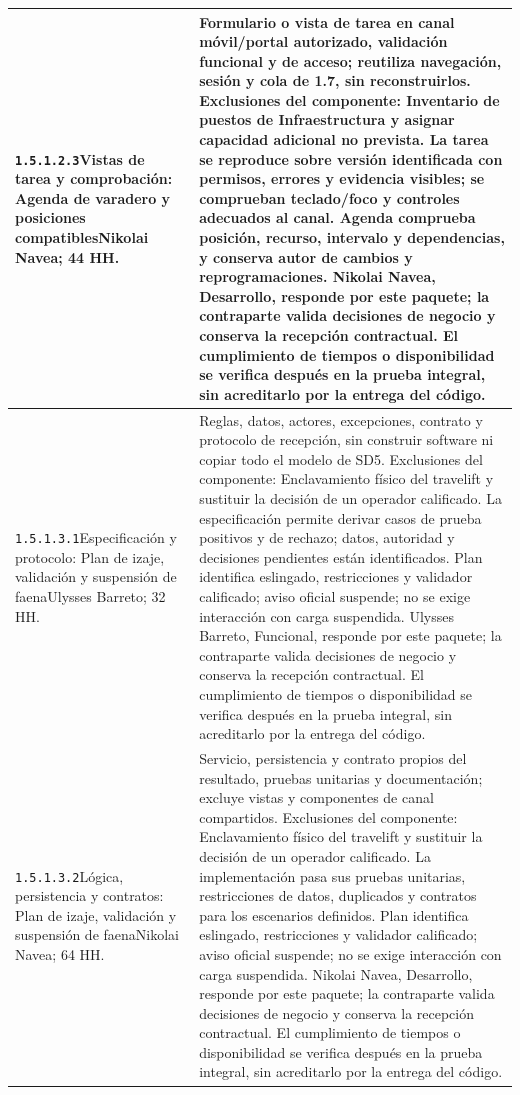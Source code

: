 \begin{longtable}{L{52mm}L{91mm}}
\texttt{1.\allowbreak{}5.\allowbreak{}1.\allowbreak{}2.\allowbreak{}3}\newline Vistas de tarea y comprobación: Agenda de varadero y posiciones compatibles\newline Nikolai Navea; 44 HH. & Formulario o vista de tarea en canal móvil/portal autorizado, validación funcional y de acceso; reutiliza navegación, sesión y cola de 1.7, sin reconstruirlos. Exclusiones del componente: Inventario de puestos de Infraestructura y asignar capacidad adicional no prevista. La tarea se reproduce sobre versión identificada con permisos, errores y evidencia visibles; se comprueban teclado/foco y controles adecuados al canal. Agenda comprueba posición, recurso, intervalo y dependencias, y conserva autor de cambios y reprogramaciones. Nikolai Navea, Desarrollo, responde por este paquete; la contraparte valida decisiones de negocio y conserva la recepción contractual. El cumplimiento de tiempos o disponibilidad se verifica después en la prueba integral, sin acreditarlo por la entrega del código.\\\hline
\texttt{1.\allowbreak{}5.\allowbreak{}1.\allowbreak{}3.\allowbreak{}1}\newline Especificación y protocolo: Plan de izaje, validación y suspensión de faena\newline Ulysses Barreto; 32 HH. & Reglas, datos, actores, excepciones, contrato y protocolo de recepción, sin construir software ni copiar todo el modelo de SD5. Exclusiones del componente: Enclavamiento físico del travelift y sustituir la decisión de un operador calificado. La especificación permite derivar casos de prueba positivos y de rechazo; datos, autoridad y decisiones pendientes están identificados. Plan identifica eslingado, restricciones y validador calificado; aviso oficial suspende; no se exige interacción con carga suspendida. Ulysses Barreto, Funcional, responde por este paquete; la contraparte valida decisiones de negocio y conserva la recepción contractual. El cumplimiento de tiempos o disponibilidad se verifica después en la prueba integral, sin acreditarlo por la entrega del código.\\\hline
\texttt{1.\allowbreak{}5.\allowbreak{}1.\allowbreak{}3.\allowbreak{}2}\newline Lógica, persistencia y contratos: Plan de izaje, validación y suspensión de faena\newline Nikolai Navea; 64 HH. & Servicio, persistencia y contrato propios del resultado, pruebas unitarias y documentación; excluye vistas y componentes de canal compartidos. Exclusiones del componente: Enclavamiento físico del travelift y sustituir la decisión de un operador calificado. La implementación pasa sus pruebas unitarias, restricciones de datos, duplicados y contratos para los escenarios definidos. Plan identifica eslingado, restricciones y validador calificado; aviso oficial suspende; no se exige interacción con carga suspendida. Nikolai Navea, Desarrollo, responde por este paquete; la contraparte valida decisiones de negocio y conserva la recepción contractual. El cumplimiento de tiempos o disponibilidad se verifica después en la prueba integral, sin acreditarlo por la entrega del código.\\\hline

\end{longtable}
